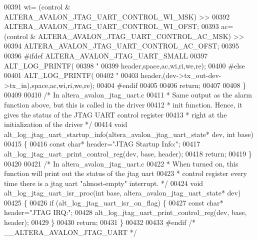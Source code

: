 \begin{DoxyCode}
{{{00391      wi= (control & ALTERA\_AVALON\_JTAG\_UART\_CONTROL\_WI\_MSK) >>
00392          ALTERA\_AVALON\_JTAG\_UART\_CONTROL\_WI\_OFST;
00393      ac= (control & ALTERA\_AVALON\_JTAG\_UART\_CONTROL\_AC\_MSK) >>
00394          ALTERA\_AVALON\_JTAG\_UART\_CONTROL\_AC\_OFST;
00395          
00396 \textcolor{preprocessor}{#ifdef ALTERA\_AVALON\_JTAG\_UART\_SMALL}
00397     ALT_LOG_PRINTF(
00398      \textcolor{stringliteral}{"%
00399          header,space,ac,wi,ri,we,re);
00400 \textcolor{preprocessor}{#else}
00401     ALT_LOG_PRINTF(
00402      \textcolor{stringliteral}{"%
00403          header,(dev->tx\_out-dev->tx\_in),space,ac,wi,ri,we,re);
00404 \textcolor{preprocessor}{#endif   }
00405          
00406      \textcolor{keywordflow}{return};
00407 
00408 \}
00409 
00410 \textcolor{comment}{/* In altera\_avalon\_jtag\_uart.c}
00411 \textcolor{comment}{ * Same output as the alarm function above, but this is called in the driver}
00412 \textcolor{comment}{ * init function.  Hence, it gives the status of the JTAG UART control register}
00413 \textcolor{comment}{ * right at the initialization of the driver */} 
00414 \textcolor{keywordtype}{void} alt\_log\_jtag\_uart\_startup\_info(altera\_avalon\_jtag\_uart\_state* dev, \textcolor{keywordtype}{int} base)
00415 \{
00416      \textcolor{keyword}{const} \textcolor{keywordtype}{char}* header=\textcolor{stringliteral}{"JTAG Startup Info:"};
00417      alt\_log\_jtag\_uart\_print\_control\_reg(dev, base, header);
00418      \textcolor{keywordflow}{return};
00419 \}
00420 
00421 \textcolor{comment}{/* In altera\_avalon\_jtag\_uart.c}
00422 \textcolor{comment}{ * When turned on, this function will print out the status of the jtag uart}
00423 \textcolor{comment}{ * control register every time there is a jtag uart "almost-empty" interrupt. */}
00424 \textcolor{keywordtype}{void} alt\_log\_jtag\_uart\_isr\_proc(\textcolor{keywordtype}{int} base, altera\_avalon\_jtag\_uart\_state* dev) 
00425 \{
00426     \textcolor{keywordflow}{if} (alt\_log\_jtag\_uart\_isr\_on\_flag) \{
00427         \textcolor{keyword}{const} \textcolor{keywordtype}{char}* header=\textcolor{stringliteral}{"JTAG IRQ:"};
00428         alt\_log\_jtag\_uart\_print\_control\_reg(dev, base, header);
00429     \}
00430     \textcolor{keywordflow}{return};
00431 \}
00432 
00433 \textcolor{preprocessor}{#endif }\textcolor{comment}{/* \_\_ALTERA\_AVALON\_JTAG\_UART */}\textcolor{preprocessor}{ }
}}}}}
\end{DoxyCode}
